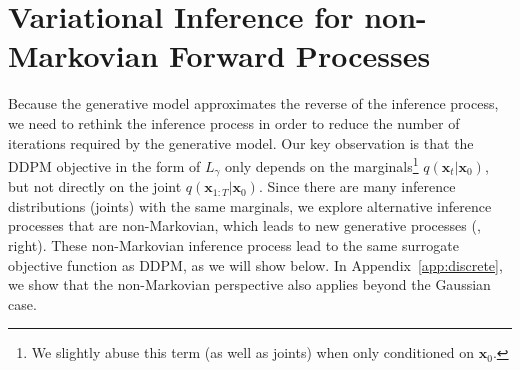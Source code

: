 \section{Variational Inference for non-Markovian Forward Processes}
\label{sec:variational}

Because the generative model approximates the reverse of the inference process, we need to rethink the inference process in order to reduce the number of iterations required by the generative model.
Our key observation is that the DDPM objective in the form of $L_\gamma$ only depends on the marginals\footnote{We slightly abuse this term (as well as joints) when only conditioned on $\bm{x}_0$.} $q(\bm{x}_t | \bm{x}_0)$, but not directly on the joint $q(\bm{x}_{1:T} | \bm{x}_{0})$. Since there are many inference distributions (joints) with the same marginals, we 
explore 
alternative
inference processes that are non-Markovian, which leads
to new generative processes (, right). 
These non-Markovian inference process lead to the same surrogate objective function as DDPM, as we will show below.
In Appendix~\ref{app:discrete}, we show that the non-Markovian perspective also applies beyond the Gaussian case.

